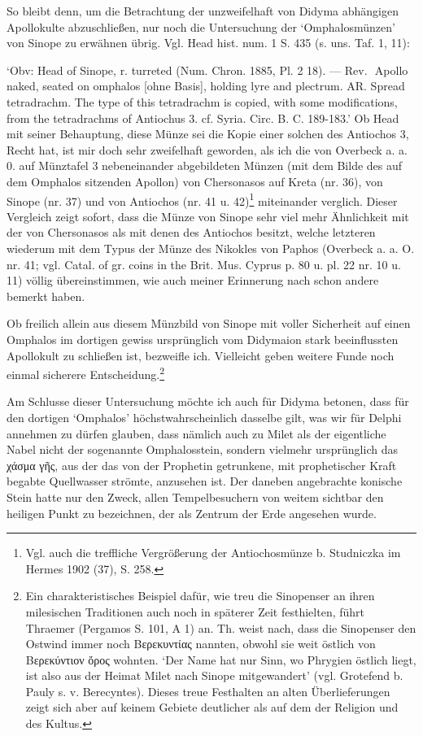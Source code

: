 \documentclass[a4paper, 11pt, oneside]{article}
\newcommand*\svgAAK{}
\begin{document}
So bleibt denn, um die Betrachtung der unzweifelhaft von Didyma abhängigen Apollokulte abzuschließen, nur noch die Untersuchung der `Omphalosmünzen' von Sinope zu erwähnen übrig. Vgl. Head hist. num. 1 S. 435 (s. uns. Taf. 1, 11):

`Obv: Head of Sinope, r. turreted (Num. Chron. 1885, Pl. 2 18). --- Rev. $\svgAAK$ Apollo naked, seated on omphalos [ohne Basis], holding lyre and plectrum. AR. Spread tetradrachm. The type of this tetradrachm is copied, with some modifications, from the tetradrachms of Antiochus 3. cf. Syria. Circ. B. C. 189-183.' Ob Head mit seiner Behauptung, diese Münze sei die Kopie einer solchen des Antiochos 3, Recht hat, ist mir doch sehr zweifelhaft geworden, als ich die von Overbeck a. a. 0. auf Münztafel 3 nebeneinander abgebildeten Münzen (mit dem Bilde des auf dem Omphalos sitzenden Apollon) von Chersonasos auf Kreta (nr. 36), von Sinope (nr. 37) und von Antiochos (nr. 41 u. 42)\footnote{Vgl. auch die treffliche Vergrößerung der Antiochosmünze b. Studniczka im Hermes 1902 (37), S. 258.} miteinander verglich. Dieser Vergleich zeigt sofort, dass die Münze von Sinope sehr viel mehr Ähnlichkeit mit der von Chersonasos als mit denen des Antiochos besitzt, welche letzteren wiederum mit dem Typus der Münze des Nikokles von Paphos (Overbeck a. a. O. nr. 41; vgl. Catal. of gr. coins in the Brit. Mus. Cyprus p. 80 u. pl. 22 nr. 10 u. 11) völlig übereinstimmen, wie auch meiner Erinnerung nach schon andere bemerkt haben.

Ob freilich allein aus diesem Münzbild von Sinope mit voller Sicherheit auf einen Omphalos im dortigen gewiss ursprünglich vom Didymaion stark beeinflussten Apollokult zu schließen ist, bezweifle ich. Vielleicht geben weitere Funde noch einmal sicherere Entscheidung.\footnote{Ein charakteristisches Beispiel dafür, wie treu die Sinopenser an ihren milesischen Traditionen auch noch in späterer Zeit festhielten, führt Thraemer (Pergamos S. 101, A 1) an. Th. weist nach, dass die Sinopenser den Ostwind immer noch Βερεκυντίας nannten, obwohl sie weit östlich von Βερεκύντιον ὄρος wohnten. `Der Name hat nur Sinn, wo Phrygien östlich liegt, ist also aus der Heimat Milet nach Sinope mitgewandert' (vgl. Grotefend b. Pauly s. v. Berecyntes). Dieses treue Festhalten an alten Überlieferungen zeigt sich aber auf keinem Gebiete deutlicher als auf dem der Religion und des Kultus.}

Am Schlusse dieser Untersuchung möchte ich auch für Didyma betonen, dass für den dortigen `Omphalos' höchstwahrscheinlich dasselbe gilt, was wir für Delphi annehmen zu dürfen glauben, dass nämlich auch zu Milet als der eigentliche Nabel nicht der sogenannte Omphalosstein, sondern vielmehr ursprünglich das χάσμα γῆς, aus der das von der Prophetin getrunkene, mit prophetischer Kraft begabte Quellwasser strömte, anzusehen ist. Der daneben angebrachte konische Stein hatte nur den Zweck, allen Tempelbesuchern von weitem sichtbar den heiligen Punkt zu bezeichnen, der als Zentrum der Erde angesehen wurde.
\clearpage
\end{document}
